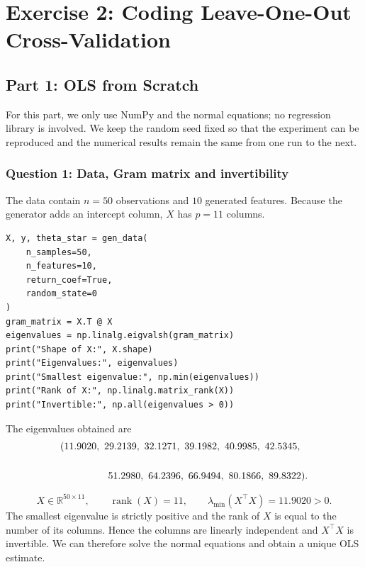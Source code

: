 \documentclass[11pt,a4paper]{article}
\newcommand{\R}{\mathbb{R}}
\begin{document}
\section{Exercise 2: Coding Leave-One-Out Cross-Validation}
\subsection{Part 1: OLS from Scratch}
For this part, we only use NumPy and the normal equations; no regression
library is involved. We keep the random seed fixed so that the experiment can
be reproduced and the numerical results remain the same from one run to the
next.
\subsubsection{Question 1: Data, Gram matrix and invertibility}
The data contain $n=50$ observations and $10$ generated features. Because the
generator adds an intercept column, $X$ has $p=11$ columns.
\begin{lstlisting}[caption={Generation of the data and analysis of the Gram matrix.}]
X, y, theta_star = gen_data(
    n_samples=50,
    n_features=10,
    return_coef=True,
    random_state=0
)
gram_matrix = X.T @ X
eigenvalues = np.linalg.eigvalsh(gram_matrix)
print("Shape of X:", X.shape)
print("Eigenvalues:", eigenvalues)
print("Smallest eigenvalue:", np.min(eigenvalues))
print("Rank of X:", np.linalg.matrix_rank(X))
print("Invertible:", np.all(eigenvalues > 0))
\end{lstlisting}
The eigenvalues obtained are
\[
\begin{split}
    &(11.9020,\ 29.2139,\ 32.1271,\ 39.1982,\ 40.9985,\ 42.5345,\\\\
    &\hspace{1.7cm}51.2980,\ 64.2396,\ 66.9494,\ 80.1866,\ 89.8322).
\end{split}
\]
\begin{resultbox}
\[
    X\in\R^{50\times11},
    \qquad
    \operatorname{rank}(X)=11,
    \qquad
    \lambda_{\min}(X^\top X)=11.9020>0.
\]
The smallest eigenvalue is strictly positive and the rank of $X$ is equal to
the number of its columns. Hence the columns are linearly independent and
$X^\top X$ is invertible. We can therefore solve the normal equations and
obtain a unique OLS estimate.
\end{resultbox}
\end{document}

